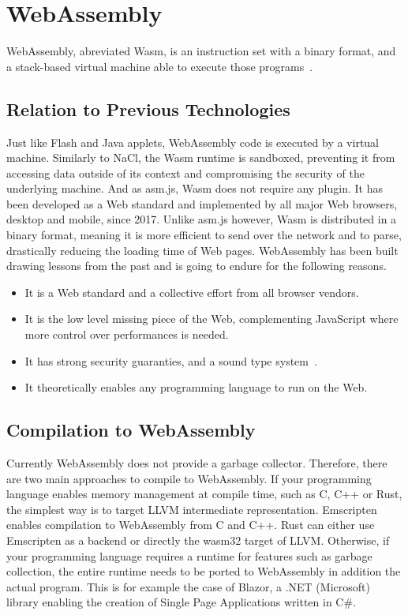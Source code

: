 \section{WebAssembly}%
\label{sec:WebAssembly}

WebAssembly, abreviated Wasm, is an instruction set with a binary format,
and a stack-based virtual machine able to execute those programs~\cite{haas2017bringing}.

\subsection{Relation to Previous Technologies}%
\label{sub:wasm_previous}

Just like Flash and Java applets, WebAssembly code
is executed by a virtual machine.
Similarly to NaCl, the Wasm runtime is sandboxed,
preventing it from accessing data outside of its context
and compromising the security of the underlying machine.
And as asm.js, Wasm does not require any plugin.
It has been developed as a Web standard and implemented
by all major Web browsers, desktop and mobile, since 2017.
Unlike asm.js however, Wasm is distributed in a binary format,
meaning it is more efficient to send over the network and to parse,
drastically reducing the loading time of Web pages.
WebAssembly has been built drawing lessons from the past and is going to endure
for the following reasons.

\begin{itemize}
	\item It is a Web standard and a collective effort from all browser vendors.
	\item It is the low level missing piece of the Web,
		complementing JavaScript where more control over performances is needed.
	\item It has strong security guaranties, and a sound type system~\cite{watt2018mechanising}.
	\item It theoretically enables any programming language to run on the Web.
\end{itemize}

\subsection{Compilation to WebAssembly}%
\label{sub:compile-wasm}

Currently WebAssembly does not provide a garbage collector.
Therefore, there are two main approaches to compile to WebAssembly.
If your programming language enables memory management at compile time,
such as C, C++ or Rust, the simplest way is to target LLVM intermediate representation.
Emscripten enables compilation to WebAssembly from C and C++.
Rust can either use Emscripten as a backend or directly the wasm32 target of LLVM.\@
Otherwise, if your programming language requires a runtime for features such as garbage collection,
the entire runtime needs to be ported to WebAssembly in addition the actual program.
This is for example the case of Blazor, a .NET (Microsoft) library
enabling the creation of Single Page Applications written in C\#.

